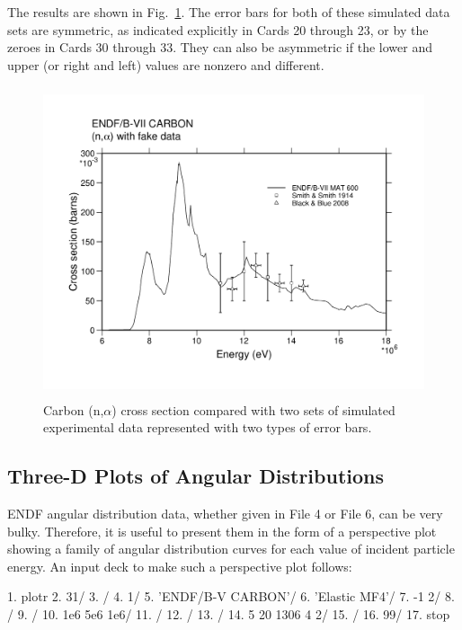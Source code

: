 The results are shown in Fig.~\ref{data}. The error bars for both of
these simulated data sets are symmetric, as indicated explicitly in
Cards 20 through 23, or by the zeroes in Cards 30 through 33.  They
can also be asymmetric if the lower and upper (or right and left)
values are nonzero and different.

\begin{figure}[b]\centering
\includegraphics[keepaspectratio, height=3.6in, angle=0]{figs/plotr7ack}
\caption[Sample plot with user data]{Carbon (n,$\alpha$) cross section
 compared with two sets of simulated experimental data represented
 with two types of error bars.}
\label{data}
\end{figure}

\subsection{Three-D Plots of Angular Distributions}
\label{ssPLOTR_3D_angdist}

ENDF angular distribution data, whether given in File 4 or File 6,
can be very bulky.  Therefore, it is useful to present them in the
form of a perspective plot showing a family of angular distribution
curves for each value of incident particle energy.  An input
deck to make such a perspective plot follows:

\small
\begin{ccode}
   1.  plotr
   2.  31/
   3.  /
   4.  1/
   5.  'ENDF/B-V CARBON'/
   6.  'Elastic MF4'/
   7.  -1 2/
   8.  /
   9.  /
  10.  1e6 5e6 1e6/
  11.  /
  12.  /
  13.  /
  14.  5 20 1306 4 2/
  15.  /
  16.  99/
  17.  stop
\end{ccode}
\normalsize

